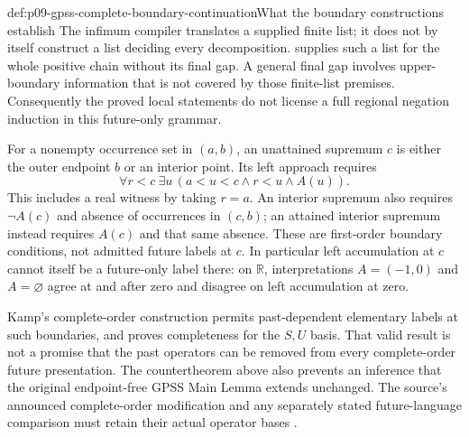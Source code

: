 \begin{proofboundary}{def:p09-gpss-complete-boundary-continuation}{What the boundary constructions establish}
The infimum compiler translates a supplied finite list; it does not
by itself construct a list deciding every decomposition.
 supplies such a list
for the whole positive chain without its final gap.
A general final gap involves upper-boundary information that is
not covered by those finite-list premises. Consequently the proved
local statements do not license a full regional negation induction
in this future-only grammar.

For a nonempty occurrence set in \((a,b)\), an unattained supremum
\(c\) is either the outer endpoint \(b\) or an interior point.
Its left approach requires
\[
 \forall r<c\ \exists u\,
          (a<u<c\land r<u\land A(u)).
\]
This includes a real witness by taking \(r=a\). An interior
supremum also requires \(\neg A(c)\) and absence of occurrences
in \((c,b)\); an attained interior supremum instead requires
\(A(c)\) and that same absence. These are first-order boundary
conditions, not admitted future labels at \(c\).
In particular left accumulation at \(c\) cannot itself be a
future-only label there: on \(\mathbb R\), interpretations
\(A=(-1,0)\) and \(A=\varnothing\) agree at and after zero
and disagree on left accumulation at zero.

Kamp's complete-order construction permits past-dependent elementary
labels at such boundaries, and proves completeness for the
\(S,U\) basis. That valid result is not a promise that the past
operators can be removed from every complete-order future presentation.
The countertheorem above also prevents an inference that the original
endpoint-free GPSS Main Lemma extends unchanged. The source's announced
complete-order modification and any separately stated future-language
comparison must retain their actual operator bases
\cite[p.~171]{GabbayPnueliShelahStavi1980}.
\end{proofboundary}
